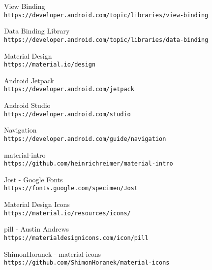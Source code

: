 \documentclass[../TakeYourPill.tex]{subfiles}
\begin{document}
\renewcommand\bibname{Bibliografie}
\begin{thebibliography}{9}

View Binding
\\\texttt{https://developer.android.com/topic/libraries/view-binding}

Data Binding Library
\\\texttt{https://developer.android.com/topic/libraries/data-binding}

Material Design
\\\texttt{https://material.io/design}

Android Jetpack
\\\texttt{https://developer.android.com/jetpack}

Android Studio
\\\texttt{https://developer.android.com/studio}

Navigation
\\\texttt{https://developer.android.com/guide/navigation}


material-intro
\\\texttt{https://github.com/heinrichreimer/material-intro}

Jost - Google Fonts
\\\texttt{https://fonts.google.com/specimen/Jost}


Material Design Icons
\\\texttt{https://material.io/resources/icons/}

pill - Austin Andrews
\\\texttt{https://materialdesignicons.com/icon/pill}

ShimonHoranek - material-icons 
\\\texttt{https://github.com/ShimonHoranek/material-icons}

\end{thebibliography}
\end{document}
